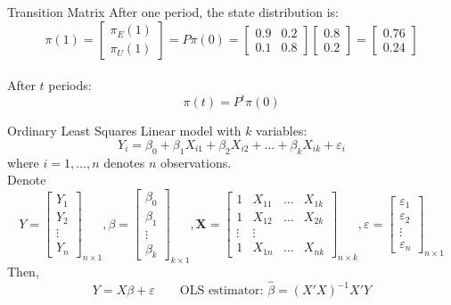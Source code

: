 \documentclass{./../../Latex/teaching_slides}
\begin{document}
\begin{frame}{Transition Matrix}
After one period, the state distribution is:
$$  \pi(1) = \begin{bmatrix}
\pi_E(1)  \\
\pi_U(1)
\end{bmatrix} = P \pi(0) = \begin{bmatrix}
0.9 & 0.2 \\
0.1 & 0.8
\end{bmatrix} \begin{bmatrix}
0.8  \\
0.2
\end{bmatrix}
 = \begin{bmatrix}
0.76  \\
0.24
\end{bmatrix}$$ \\
After $t$ periods:
$$ \pi(t) = P^t \pi(0) $$
\end{frame}

 \begin{frame}{Ordinary Least Squares}
 \vspace{-0.25cm}
Linear model with $k$ variables:
  $$ Y_i = \beta_0 + \beta_1 X_{i1} + \beta_2 X_{i2} + \hdots + \beta_k X_{ik} + \varepsilon_i $$
  where $i = 1,...,n$ denotes $n$ observations. \\
  Denote $$ Y  = \begin{bmatrix} Y_1 \\ Y_2 \\  \vdots \\ Y_n  \end{bmatrix}_{n \times 1},    
  \beta  = \begin{bmatrix} \beta_0 \\ \beta_1  \\ \vdots \\ \beta_k \end{bmatrix}_{k \times 1},  
  \boldsymbol{X} = \begin{bmatrix} 1 & X_{11} & \hdots & X_{1k} \\ 1 & X_{12} & \hdots & X_{2k}  \\ \vdots & \vdots \\ 1 & X_{1n} & \hdots & X_{nk}  \end{bmatrix}_{n \times k},  
  \varepsilon  = \begin{bmatrix} \varepsilon_1 \\ \varepsilon_2 \\ \vdots \\ \varepsilon_n  \end{bmatrix}_{n \times 1} $$
  Then, 
  $$ Y = X \beta + \varepsilon  \quad \quad \text{OLS estimator: } \hat{\beta} = (X'X)^{-1} X'Y$$
\end{frame}
\end{document}
